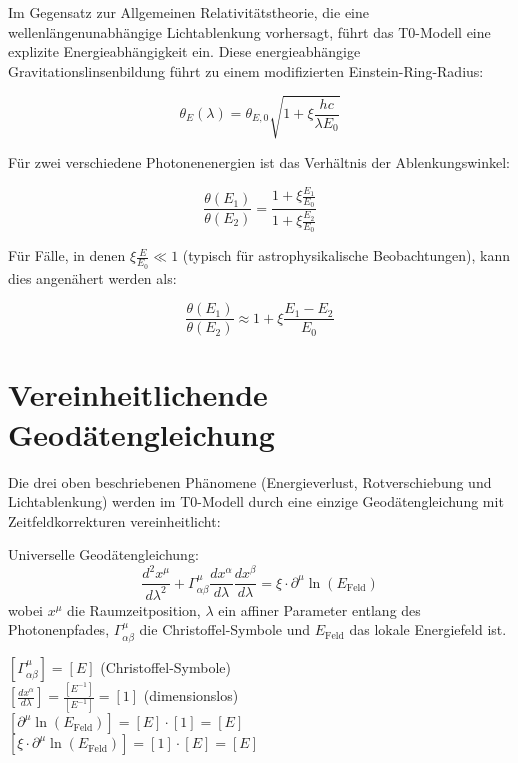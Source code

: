 \documentclass[12pt,a4paper]{article}
\newcommand{\efield}{E_{\text{Feld}}}
\theoremstyle{definition}
\begin{document}
	Im Gegensatz zur Allgemeinen Relativitätstheorie, die eine wellenlängenunabhängige Lichtablenkung vorhersagt, führt das T0-Modell eine explizite Energieabhängigkeit ein. Diese energieabhängige Gravitationslinsenbildung führt zu einem modifizierten Einstein-Ring-Radius:
	
	\begin{equation}
		\theta_E(\lambda) = \theta_{E,0} \sqrt{1 + \xi \frac{hc}{\lambda E_0}}
	\end{equation}
	
	Für zwei verschiedene Photonenenergien ist das Verhältnis der Ablenkungswinkel:
	
	\begin{equation}
		\frac{\theta(E_1)}{\theta(E_2)} = \frac{1 + \xi \frac{E_1}{E_0}}{1 + \xi \frac{E_2}{E_0}}
	\end{equation}
	
	Für Fälle, in denen $\xi \frac{E}{E_0} \ll 1$ (typisch für astrophysikalische Beobachtungen), kann dies angenähert werden als:
	
	\begin{equation}
		\frac{\theta(E_1)}{\theta(E_2)} \approx 1 + \xi \frac{E_1 - E_2}{E_0}
	\end{equation}
	
	\section{Vereinheitlichende Geodätengleichung}
	
	Die drei oben beschriebenen Phänomene (Energieverlust, Rotverschiebung und Lichtablenkung) werden im T0-Modell durch eine einzige Geodätengleichung mit Zeitfeldkorrekturen vereinheitlicht:
	
	\begin{formel}
		Universelle Geodätengleichung:
		\begin{equation}
			\boxed{\frac{d^2 x^\mu}{d\lambda^2} + \Gamma^\mu_{\alpha\beta}\frac{dx^\alpha}{d\lambda}\frac{dx^\beta}{d\lambda} = \xi \cdot \partial^\mu \ln(\efield)}
		\end{equation}
		wobei $x^\mu$ die Raumzeitposition, $\lambda$ ein affiner Parameter entlang des Photonenpfades, $\Gamma^\mu_{\alpha\beta}$ die Christoffel-Symbole und $\efield$ das lokale Energiefeld ist.
	\end{formel}
	
	\begin{dimanalysis}
		$[\Gamma^\mu_{\alpha\beta}] = [E]$ (Christoffel-Symbole)\\
		$\left[\frac{dx^\alpha}{d\lambda}\right] = \frac{[E^{-1}]}{[E^{-1}]} = [1]$ (dimensionslos)\\
		$[\partial^\mu \ln(\efield)] = [E] \cdot [1] = [E]$\\
		$[\xi \cdot \partial^\mu \ln(\efield)] = [1] \cdot [E] = [E]$ \checkmark
	\end{dimanalysis}
	
\end{document}
